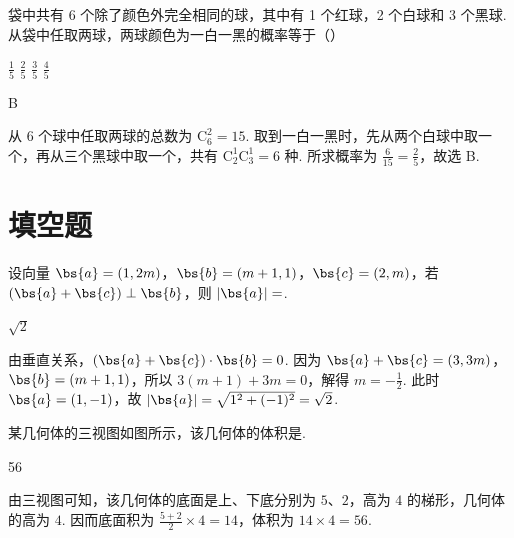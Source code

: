 \begin{problem}
袋中共有 6 个除了颜色外完全相同的球，其中有 1 个红球，2 个白球和 3 个黑球. 从袋中任取两球，两球颜色为一白一黑的概率等于（\quad）

\choices
    {\( \frac{1}{5} \)}
    {\( \frac{2}{5} \)}
    {\( \frac{3}{5} \)}
    {\( \frac{4}{5} \)}
\end{problem}

\begin{answer}
B
\end{answer}

\begin{solution}
从 \(6\) 个球中任取两球的总数为 \(\mathrm C_6^2=15\). 取到一白一黑时，先从两个白球中取一个，再从三个黑球中取一个，共有 \(\mathrm C_2^1\mathrm C_3^1=6\) 种. 所求概率为 \(\frac{6}{15}=\frac{2}{5}\)，故选 B.
\end{solution}

\section{填空题}

\begin{problem}
设向量 \(\bs{a} = (1, 2m)\)，\(\bs{b} = (m + 1, 1)\)，\(\bs{c} = (2, m)\)，若 \((\bs{a} + \bs{c}) \perp \bs{b}\)，则 \(|\bs{a}| = \)\fillinblank{}.
\end{problem}

\begin{answer}
\(\sqrt{2}\)
\end{answer}

\begin{solution}
由垂直关系，\((\bs{a}+\bs{c})\cdot\bs{b}=0\). 因为 \(\bs{a}+\bs{c}=(3,3m)\)，\(\bs{b}=(m+1,1)\)，所以 \(3(m+1)+3m=0\)，解得 \(m=-\frac{1}{2}\). 此时 \(\bs{a}=(1,-1)\)，故 \(|\bs{a}|=\sqrt{1^2+(-1)^2}=\sqrt{2}\).
\end{solution}

\begin{problem}
某几何体的三视图如图所示，该几何体的体积是\fillinblank{}.

\FloatBarrier
\end{problem}

\begin{answer}
56
\end{answer}

\begin{solution}
由三视图可知，该几何体的底面是上、下底分别为 \(5\)、\(2\)，高为 \(4\) 的梯形，几何体的高为 \(4\). 因而底面积为 \(\frac{5+2}{2}\times4=14\)，体积为 \(14\times4=56\).
\end{solution}

